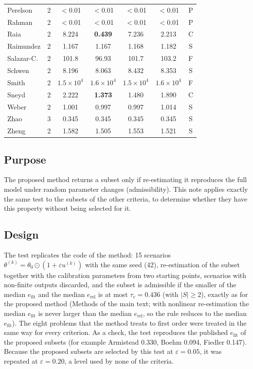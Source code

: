 \begin{table}[H]
\begin{tabular}{@{}lrccccc@{}}
Perelson     & 2  & $<$0.01 & $<$0.01 & $<$0.01 & $<$0.01 & P \\
Rahman       & 2  & $<$0.01 & $<$0.01 & $<$0.01 & $<$0.01 & P \\
Raia         & 2  & 8.224 & \textbf{0.439} & 7.236 & 2.213 & C \\
Raimundez    & 2  & 1.167 & 1.167 & 1.168 & 1.182 & S \\
Salazar-C.   & 2  & 101.8 & 96.93 & 101.7 & 103.2 & F \\
Schwen       & 2  & 8.196 & 8.063 & 8.432 & 8.353 & S \\
Smith        & 2  & $1.5\times10^4$ & $1.6\times10^4$ & $1.5\times10^4$ & $1.6\times10^4$ & F \\
Sneyd        & 2  & 2.222 & \textbf{1.373} & 1.480 & 1.890 & C \\
Weber        & 2  & 1.001 & 0.997 & 0.997 & 1.014 & S \\
Zhao         & 3  & 0.345 & 0.345 & 0.345 & 0.345 & S \\
Zheng        & 2  & 1.582 & 1.505 & 1.553 & 1.521 & S \\
\bottomrule
\end{tabular}
\end{table}


\subsection*{Purpose}
The proposed method returns a subset only if re-estimating it reproduces the full model under random parameter changes (admissibility). This note applies exactly the same test to the subsets of the other criteria, to determine whether they have this property without being selected for it.

\subsection*{Design}
The test replicates the code of the method: 15 scenarios $\theta^{(k)}=\theta_0\odot(1+\varepsilon u^{(k)})$ with the same seed (42), re-estimation of the subset together with the calibration parameters from two starting points, scenarios with non-finite outputs discarded, and the subset is admissible if the smaller of the median $e_{\mathrm{fit}}$ and the median $e_{\mathrm{rel}}$ is at most $\tau_e=0.436$ (with $|S|\ge2$), exactly as for the proposed method (Methods of the main text; with nonlinear re-estimation the median $e_{\mathrm{fit}}$ is never larger than the median $e_{\mathrm{rel}}$, so the rule reduces to the median $e_{\mathrm{fit}}$). The eight problems that the method treats to first order were treated in the same way for every criterion. As a check, the test reproduces the published $e_{\mathrm{fit}}$ of the proposed subsets (for example Armistead 0.330, Boehm 0.094, Fiedler 0.147). Because the proposed subsets are selected by this test at $\varepsilon=0.05$, it was repeated at $\varepsilon=0.20$, a level used by none of the criteria.


